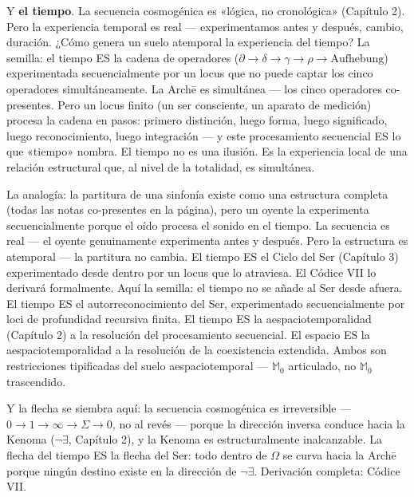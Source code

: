 \documentclass[10pt, openany, oneside]{book}
\begin{document}
Y \textbf{el tiempo}. La secuencia cosmogénica es «lógica, no cronológica» (Capítulo 2). Pero la experiencia temporal es real --- experimentamos antes y después, cambio, duración. ¿Cómo genera un suelo atemporal la experiencia del tiempo? La semilla: el tiempo ES la cadena de operadores ($\partial \to \delta \to \gamma \to \rho \to \text{Aufhebung}$) experimentada secuencialmente por un locus que no puede captar los cinco operadores simultáneamente. La Arch\={e} es simultánea --- los cinco operadores co-presentes. Pero un locus finito (un ser consciente, un aparato de medición) procesa la cadena en pasos: primero distinción, luego forma, luego significado, luego reconocimiento, luego integración --- y este procesamiento secuencial ES lo que «tiempo» nombra. El tiempo no es una ilusión. Es la experiencia local de una relación estructural que, al nivel de la totalidad, es simultánea.

La analogía: la partitura de una sinfonía existe como una estructura completa (todas las notas co-presentes en la página), pero un oyente la experimenta secuencialmente porque el oído procesa el sonido en el tiempo. La secuencia es real --- el oyente genuinamente experimenta antes y después. Pero la estructura es atemporal --- la partitura no cambia. El tiempo ES el Ciclo del Ser (Capítulo 3) experimentado desde dentro por un locus que lo atraviesa. El Códice VII lo derivará formalmente. Aquí la semilla: el tiempo no se añade al Ser desde afuera. El tiempo ES el autorreconocimiento del Ser, experimentado secuencialmente por loci de profundidad recursiva finita. El tiempo ES la aespaciotemporalidad (Capítulo 2) a la resolución del procesamiento secuencial. El espacio ES la aespaciotemporalidad a la resolución de la coexistencia extendida. Ambos son restricciones tipificadas del suelo aespaciotemporal --- $\mathbb{M}_0$ articulado, no $\mathbb{M}_0$ trascendido.

Y la flecha se siembra aquí: la secuencia cosmogénica es irreversible --- $0 \to 1 \to \infty \to \Sigma \to 0$, no al revés --- porque la dirección inversa conduce hacia la Kenoma ($\neg\exists$, Capítulo 2), y la Kenoma es estructuralmente inalcanzable. La flecha del tiempo ES la flecha del Ser: todo dentro de $\Omega$ se curva hacia la Arch\={e} porque ningún destino existe en la dirección de $\neg\exists$. Derivación completa: Códice VII.

\vspace{1.5em}

\end{document}
